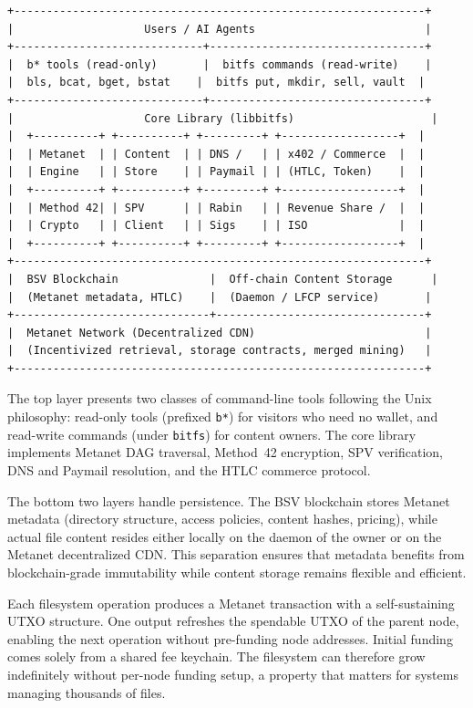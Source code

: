 \documentclass[11pt,a4paper]{article}
\begin{document}
\begin{lstlisting}
+---------------------------------------------------------------+
|                    Users / AI Agents                          |
+-----------------------------+---------------------------------+
|  b* tools (read-only)       |  bitfs commands (read-write)    |
|  bls, bcat, bget, bstat    |  bitfs put, mkdir, sell, vault  |
+-----------------------------+---------------------------------+
|                    Core Library (libbitfs)                     |
|  +----------+ +----------+ +---------+ +------------------+  |
|  | Metanet  | | Content  | | DNS /   | | x402 / Commerce  |  |
|  | Engine   | | Store    | | Paymail | | (HTLC, Token)    |  |
|  +----------+ +----------+ +---------+ +------------------+  |
|  | Method 42| | SPV      | | Rabin   | | Revenue Share /  |  |
|  | Crypto   | | Client   | | Sigs    | | ISO              |  |
|  +----------+ +----------+ +---------+ +------------------+  |
+---------------------------------------------------------------+
|  BSV Blockchain              |  Off-chain Content Storage      |
|  (Metanet metadata, HTLC)    |  (Daemon / LFCP service)       |
+------------------------------+--------------------------------+
|  Metanet Network (Decentralized CDN)                          |
|  (Incentivized retrieval, storage contracts, merged mining)   |
+---------------------------------------------------------------+
\end{lstlisting}

The top layer presents two classes of command-line tools following the Unix philosophy: read-only tools (prefixed \texttt{b*}) for visitors who need no wallet, and read-write commands (under \texttt{bitfs}) for content owners. The core library implements Metanet DAG traversal, Method~42 encryption, SPV verification, DNS and Paymail resolution, and the HTLC commerce protocol.

The bottom two layers handle persistence. The BSV blockchain stores Metanet metadata (directory structure, access policies, content hashes, pricing), while actual file content resides either locally on the daemon of the owner or on the Metanet decentralized CDN. This separation ensures that metadata benefits from blockchain-grade immutability while content storage remains flexible and efficient.

Each filesystem operation produces a Metanet transaction with a self-sustaining UTXO structure. One output refreshes the spendable UTXO of the parent node, enabling the next operation without pre-funding node addresses. Initial funding comes solely from a shared fee keychain. The filesystem can therefore grow indefinitely without per-node funding setup, a property that matters for systems managing thousands of files.
\end{document}
